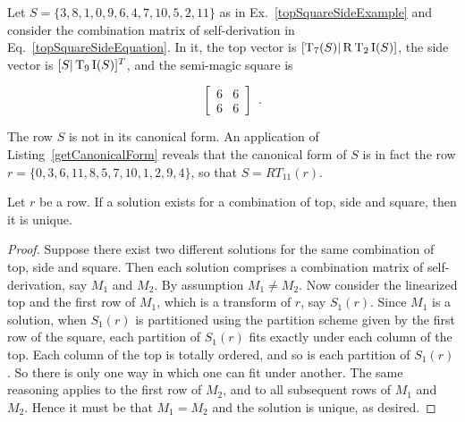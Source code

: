 \begin{example}
Let $S = \{ 3, 8, 1, 0, 9, 6, 4, 7, 10, 5, 2, 11 \}$ as in Ex.~\ref{topSquareSideExample} and consider the combination matrix of self-derivation in Eq.~\ref{topSquareSideEquation}. In it, the top vector is $[\operatorname{T}_7(S) | \operatorname{R}\operatorname{T}_2\operatorname{I}(S)]$, the side vector is $[S | \operatorname{T}_9\operatorname{I}(S)]^T$, and the semi-magic square is

	\begin{equation}
        \left[
        \begin{array}{c|c}
            6 & 6 \\
            \hline
            6 & 6
        \end{array}
        \right] \enspace.
    \end{equation}
    
\noindent The row $S$ is not in its canonical form. An application of Listing~\ref{getCanonicalForm} reveals that the canonical form of $S$ is in fact the row $r = \{0, 3, 6, 11, 8, 5, 7, 10, 1, 2, 9, 4\}$, so that $S = RT_{11}(r)$.
\end{example}

\begin{theorem}
	\label{topSquareSideTheorem}
	Let $r$ be a row. If a solution exists for a combination of top, side and square, then it is unique.
	\begin{proof}
	Suppose there exist two different solutions for the same combination of top, side and square. Then each solution comprises a combination matrix of self-derivation, say $M_1$ and $M_2$. By assumption $M_1 \ne M_2$. Now consider the linearized top and the first row of $M_1$, which is a transform of $r$, say $S_1(r)$. Since $M_1$ is a solution, when $S_1(r)$ is partitioned using the partition scheme given by the first row of the square, each partition of $S_1(r)$ fits exactly under each column of the top. Each column of the top is totally ordered, and so is each partition of $S_1(r)$. So there is only one way in which one can fit under another. The same reasoning applies to the first row of $M_2$, and to all subsequent rows of $M_1$ and $M_2$. Hence it must be that $M_1 = M_2$ and the solution is unique, as desired.
	\end{proof}
\end{theorem}

